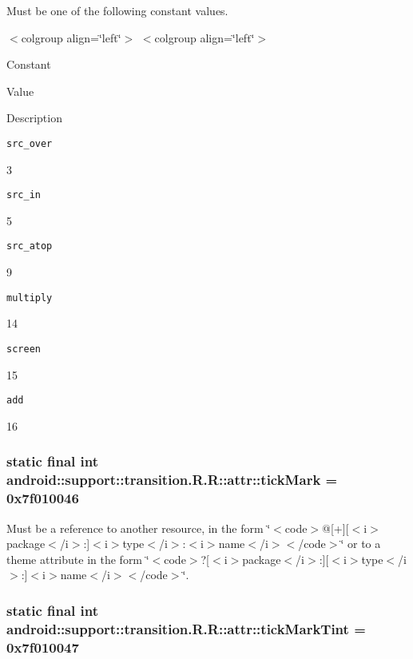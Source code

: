 Must be one of the following constant values. \begin{TabularC}{0}
\hline
\end{TabularC}
$<$colgroup align=\char`\"{}left\char`\"{}$>$ $<$colgroup align=\char`\"{}left\char`\"{}$>$ 

Constant

Value

Description 

{\tt src\_\-over}

3

{\tt src\_\-in}

5

{\tt src\_\-atop}

9

{\tt multiply}

14

{\tt screen}

15

{\tt add}

16\hypertarget{classandroid_1_1support_1_1transition_1_1_r_1_1attr_a8f056c4ea8effbc84b15f7b62bc31af}{
\subsubsection[{tickMark}]{\setlength{\rightskip}{0pt plus 5cm}static final int android::support::transition.R.R::attr::tickMark = 0x7f010046}}
\label{classandroid_1_1support_1_1transition_1_1_r_1_1attr_a8f056c4ea8effbc84b15f7b62bc31af}


Must be a reference to another resource, in the form \char`\"{}$<$code$>$@\mbox{[}+\mbox{]}\mbox{[}$<$i$>$package$<$/i$>$:\mbox{]}$<$i$>$type$<$/i$>$:$<$i$>$name$<$/i$>$$<$/code$>$\char`\"{} or to a theme attribute in the form \char`\"{}$<$code$>$?\mbox{[}$<$i$>$package$<$/i$>$:\mbox{]}\mbox{[}$<$i$>$type$<$/i$>$:\mbox{]}$<$i$>$name$<$/i$>$$<$/code$>$\char`\"{}. \hypertarget{classandroid_1_1support_1_1transition_1_1_r_1_1attr_42cd4cbaadb1025e414b600e3b9d29f5}{
\subsubsection[{tickMarkTint}]{\setlength{\rightskip}{0pt plus 5cm}static final int android::support::transition.R.R::attr::tickMarkTint = 0x7f010047}}
\label{classandroid_1_1support_1_1transition_1_1_r_1_1attr_42cd4cbaadb1025e414b600e3b9d29f5}


